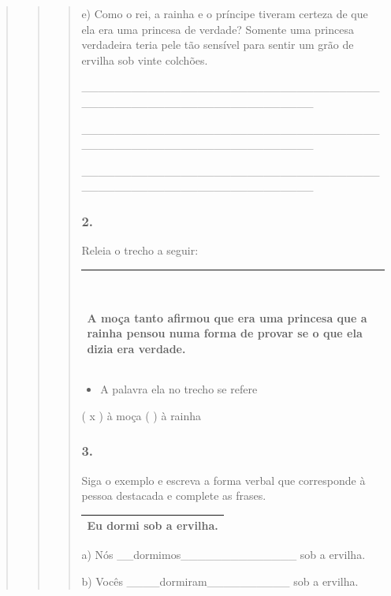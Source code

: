\begin{quote}
\begin{quote}
\begin{quote}
e) Como o rei, a rainha e o príncipe tiveram certeza de que ela era uma
princesa de verdade? Somente uma princesa verdadeira teria pele tão
sensível para sentir um grão de ervilha sob vinte colchões.

\_\_\_\_\_\_\_\_\_\_\_\_\_\_\_\_\_\_\_\_\_\_\_\_\_\_\_\_\_\_\_\_\_\_\_\_\_\_\_\_\_\_\_\_\_\_\_\_\_\_\_\_\_\_\_\_\_\_\_\_\_\_\_\_

\_\_\_\_\_\_\_\_\_\_\_\_\_\_\_\_\_\_\_\_\_\_\_\_\_\_\_\_\_\_\_\_\_\_\_\_\_\_\_\_\_\_\_\_\_\_\_\_\_\_\_\_\_\_\_\_\_\_\_\_\_\_\_\_

\_\_\_\_\_\_\_\_\_\_\_\_\_\_\_\_\_\_\_\_\_\_\_\_\_\_\_\_\_\_\_\_\_\_\_\_\_\_\_\_\_\_\_\_\_\_\_\_\_\_\_\_\_\_\_\_\_\_\_\_\_\_\_\_

\subsubsection{2. }\label{section-72}

Releia o trecho a seguir:

\begin{longtable}[]{@{}l@{}}
\toprule
\begin{minipage}[t]{0.97\columnwidth}\raggedright\strut
~ ~

A moça tanto afirmou que era uma princesa que a rainha pensou numa forma
de provar se o que ela dizia era verdade.\strut
\end{minipage}\tabularnewline
\bottomrule
\end{longtable}

\begin{itemize}
\item
  A palavra ela no trecho se refere
\end{itemize}

( x ) à moça ( ) à rainha

\subsubsection{3. }\label{section-73}

Siga o exemplo e escreva a forma verbal que corresponde à pessoa
destacada e complete as frases.

\begin{longtable}[]{@{}l@{}}
\toprule
\textbf{Eu dormi} sob a ervilha.\tabularnewline
\bottomrule
\end{longtable}

a) Nós \_\_dormimos\_\_\_\_\_\_\_\_\_\_\_\_\_\_ sob a ervilha.

b) Vocês \_\_\_\_dormiram\_\_\_\_\_\_\_\_\_\_ sob a ervilha.


\end{quote}
\end{quote}
\end{quote}
